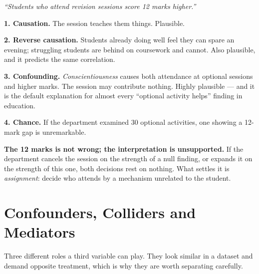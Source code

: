 \begin{worked}
\emph{``Students who attend revision sessions score 12 marks higher.''}

\smallskip
\textbf{1. Causation.} The session teaches them things. Plausible.

\textbf{2. Reverse causation.} Students already doing well feel they can spare an
evening; struggling students are behind on coursework and cannot. Also plausible,
and it predicts the same correlation.

\textbf{3. Confounding.} \emph{Conscientiousness} causes both attendance at
optional sessions and higher marks. The session may contribute nothing. Highly
plausible --- and it is the default explanation for almost every ``optional
activity helps'' finding in education.

\textbf{4. Chance.} If the department examined 30 optional activities, one showing
a 12-mark gap is unremarkable.

\smallskip
\textbf{The 12 marks is not wrong; the interpretation is unsupported.} If the
department cancels the session on the strength of a null finding, or expands it on
the strength of this one, both decisions rest on nothing. What settles it is
\emph{assignment}: decide who attends by a mechanism unrelated to the student.
\end{worked}

\section{Confounders, Colliders and Mediators}

Three different roles a third variable can play. They look similar in a dataset
and demand opposite treatment, which is why they are worth separating carefully.

